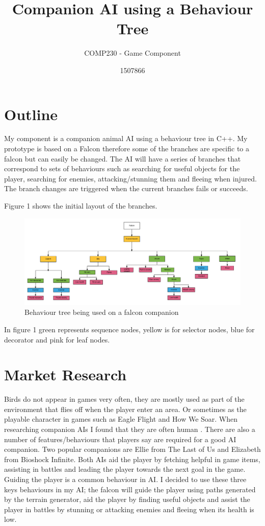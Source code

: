 \documentclass{scrartcl}
\title{ Companion AI using a Behaviour Tree }
\subtitle{COMP230 - Game Component}
\author{1507866}
\begin{document}
	
\maketitle
	
\section{Outline}
My component is a companion animal AI using a behaviour tree in C++. My prototype is based on a Falcon therefore some of the branches are specific to a falcon but can easily be changed. The AI will have a series of branches that correspond to sets of behaviours such as searching  for useful objects for the player, searching for enemies, attacking/stunning them and fleeing when injured.  The branch changes are triggered when the current branches fails or succeeds.

Figure 1 shows the initial layout of the branches.  

\begin{figure}[h]
	\includegraphics[width=1.2\linewidth]{behaviour_tree.png}
	\caption{ Behaviour tree being used on a falcon companion}
\end{figure} 

In figure 1 green represents sequence nodes, yellow is for selector nodes, blue for decorator and pink for leaf nodes.
 
\newpage

\section{Market Research}
Birds do not appear in games very often, they are mostly used as part of the environment that flies off when the player enter an area. Or sometimes as the playable character in games such as Eagle Flight and How We Soar. 
When researching companion AIs I found that they are often human \cite{DragonAge, LastOfUs, Bioshock}. There are also a number of features/behaviours that players say are required for a good AI companion. 
\bigskip
Two popular companions are Ellie from The Last of Us and Elizabeth from Bioshock Infinite. Both AIs aid the player by fetching helpful in game items, assisting in battles and leading the player towards the next goal in the game.
Guiding the player is a common behaviour in AI. I decided to use these three keys behaviours in my AI; the falcon will guide the player using paths generated by the terrain generator, aid the player by finding useful objects and assist the player in battles by stunning or attacking enemies and fleeing when its health is low.
\end{document}
